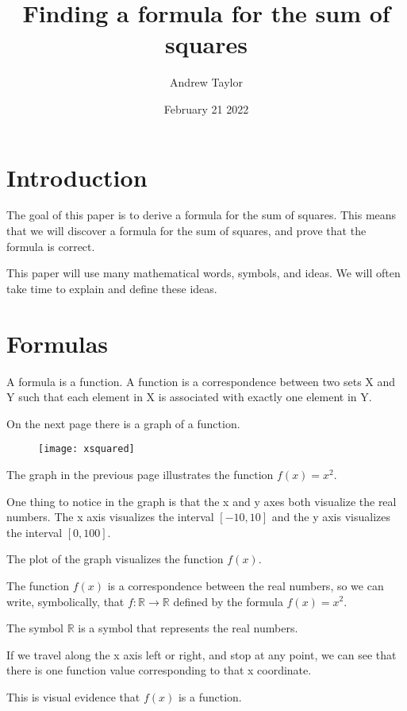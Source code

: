 \documentclass{article}
\title{Finding a formula for the sum of squares}
\author{Andrew Taylor}
\date{February 21 2022}
\begin{document}
\maketitle
\section{Introduction}
\begin{flushleft}
The goal of this paper is to derive a formula for the sum of squares. This means that we will discover a formula for the sum of squares, and prove that the formula is correct. 
\end{flushleft}

\begin{flushleft}
This paper will use many mathematical words, symbols, and ideas. We will often take time to explain and define these ideas.
\end{flushleft}
\section{Formulas}
\begin{flushleft}
A formula is a function. A function is a correspondence between two sets X and Y such that each element in X is associated with exactly one element in Y.
\end{flushleft}
\begin{flushleft}
On the next page there is a graph of a function.
\end{flushleft}
\begin{figure}
\centering
\texttt{[image: xsquared]}
\end{figure}
\clearpage
\begin{flushleft}
The graph in the previous page illustrates the function $f(x) = x^2$. 
\end{flushleft}
\begin{flushleft}
One thing to notice in the graph is that the x and y axes both visualize the real numbers. The x axis visualizes the interval $[-10, 10]$ and the y axis visualizes the interval $[0, 100]$.
\end{flushleft}
\begin{flushleft}
The plot of the graph visualizes the function $f(x)$. 
\end{flushleft}
\begin{flushleft}
The function $f(x)$ is a correspondence between the real numbers, so we can write, symbolically, that $f : \mathbb{R} \rightarrow \mathbb{R}$ defined by the formula $f(x) = x^2$. 
\end{flushleft}
\begin{flushleft}
The symbol $\mathbb{R}$ is a symbol that represents the real numbers.
\end{flushleft}
\begin{flushleft}
If we travel along the x axis left or right, and stop at any point, we can see that there is one function value corresponding to that x coordinate. 
\end{flushleft}
\begin{flushleft}
This is visual evidence that $f(x)$ is a function.
\end{flushleft}
\end{document}
